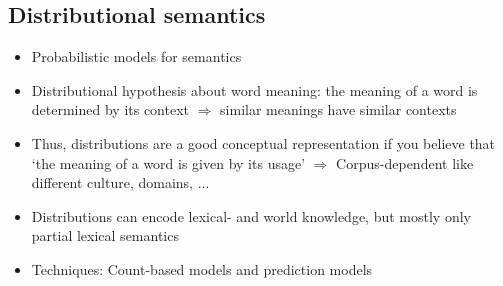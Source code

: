 \subsection{Distributional semantics}
\begin{itemize}
	\item Probabilistic models for semantics
	\item Distributional hypothesis about word meaning: the meaning of a word is determined by its context $\Rightarrow$ similar meanings have similar contexts
	\item Thus, distributions are a good conceptual representation if you believe that ‘the meaning of a word is given by its usage’ $\Rightarrow$ Corpus-dependent like different culture, domains, ...
	\item Distributions can encode lexical- and world knowledge, but mostly only partial lexical semantics 
	\item Techniques: Count-based models and prediction models
\end{itemize}
